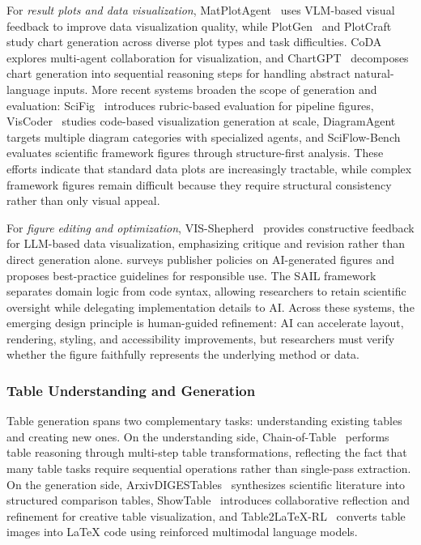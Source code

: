For \emph{result plots and data visualization}, MatPlotAgent~\cite{matplotagent2024} uses VLM-based visual feedback to improve data visualization quality, while PlotGen~\cite{plotgen2025} and PlotCraft~\cite{plotcraft2025} study chart generation across diverse plot types and task difficulties. CoDA~\cite{coda2025} explores multi-agent collaboration for visualization, and ChartGPT~\cite{yuan2023chartgpt} decomposes chart generation into sequential reasoning steps for handling abstract natural-language inputs. More recent systems broaden the scope of generation and evaluation: SciFig~\cite{scifig2026} introduces rubric-based evaluation for pipeline figures, VisCoder~\cite{viscoder2025} studies code-based visualization generation at scale, DiagramAgent~\cite{diagramagent2024} targets multiple diagram categories with specialized agents, and SciFlow-Bench~\cite{scifigbench2026} evaluates scientific framework figures through structure-first analysis. These efforts indicate that standard data plots are increasingly tractable, while complex framework figures remain difficult because they require structural consistency rather than only visual appeal.

For \emph{figure editing and optimization}, VIS-Shepherd~\cite{visshepherd2025} provides constructive feedback for LLM-based data visualization, emphasizing critique and revision rather than direct generation alone. \cite{aifigurepolicies2026} surveys publisher policies on AI-generated figures and proposes best-practice guidelines for responsible use. The SAIL framework~\cite{sail2026} separates domain logic from code syntax, allowing researchers to retain scientific oversight while delegating implementation details to AI. Across these systems, the emerging design principle is human-guided refinement: AI can accelerate layout, rendering, styling, and accessibility improvements, but researchers must verify whether the figure faithfully represents the underlying method or data.



\subsubsection{Table Understanding and Generation}
\label{sec:table_gen}

Table generation spans two complementary tasks: understanding existing tables and creating new ones. On the understanding side, Chain-of-Table~\cite{chainoftable2024} performs table reasoning through multi-step table transformations, reflecting the fact that many table tasks require sequential operations rather than single-pass extraction. On the generation side, ArxivDIGESTables~\cite{arxivdigestables2024} synthesizes scientific literature into structured comparison tables, ShowTable~\cite{showtable2025} introduces collaborative reflection and refinement for creative table visualization, and Table2LaTeX-RL~\cite{table2latexrl2025} converts table images into LaTeX code using reinforced multimodal language models.

